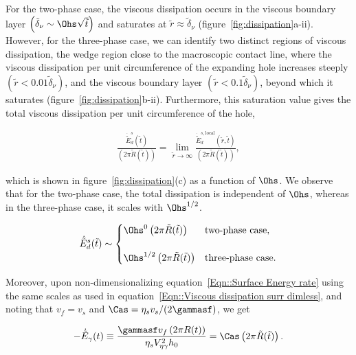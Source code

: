For the two-phase case, the viscous dissipation occurs in the viscous boundary layer $\left( \tilde{\delta}_\nu \sim \Ohs\sqrt{\tilde{t}}\right)$ and saturates at $\tilde{r} \approx \tilde{\delta}_\nu$ (figure~\ref{fig:dissipation}a-ii). However, for the three-phase case, we can identify two distinct regions of viscous dissipation, the wedge region close to the macroscopic contact line, where the viscous dissipation per unit circumference of the expanding hole increases steeply $\left(\tilde{r} < 0.01\tilde{\delta}_\nu\right)$, and the viscous boundary layer $\left(\tilde{r} < 0.1\tilde{\delta}_\nu\right)$, beyond which it saturates (figure~\ref{fig:dissipation}b-ii). Furthermore, this saturation value gives the total viscous dissipation per unit circumference of the hole,

\begin{align}
	\frac{\dot{\tilde{E}}_d^s(\tilde{t})}{\left(2 \pi \tilde{R}(\tilde{t})\right)} = \lim_{\tilde{r} \to \infty}\frac{\dot{\tilde{E}}_d^{s, \text{local}}\left(\tilde{r}, \tilde{t}\right)}{\left(2 \pi \tilde{R}(\tilde{t})\right)},
\end{align}

\noindent which is shown in figure~\ref{fig:dissipation}(c) as a function of $\Ohs$. We observe that for the two-phase case, the total dissipation is independent of $\Ohs$, whereas in the three-phase case, it scales with $\Ohs^{1/2}$.

\begin{align}
	\label{Eqn::Dissipation Ohs}
	\dot{\tilde{E}}_d^{s}(\tilde{t}) \sim 
	\begin{cases}
		\Ohs^{0}\left(2\pi\tilde{R}(\tilde{t})\right)&\text{two-phase case},\\
		\\
		\Ohs^{1/2}\left(2\pi\tilde{R}(\tilde{t})\right)&\text{three-phase case}.
	\end{cases}
\end{align}

Moreover, upon non-dimensionalizing equation~\eqref{Eqn::Surface Energy rate} using the same scales as used in equation~\eqref{Eqn::Viscous dissipation surr dimless}, and noting that $v_f = v_s$ and $\Cas = \eta_sv_s/(2\gammasf)$, we get

\begin{align}
	-\dot{\tilde{E}}_\gamma(t) \equiv \frac{\gammasf v_f\left(2 \pi R(t)\right)}{\eta_sV_{\eta\gamma}^2h_0} = \Cas \left(2 \pi \tilde{R}(\tilde{t})\right).
	\label{Eqn::Surface Energy rate dimless}
\end{align} 

